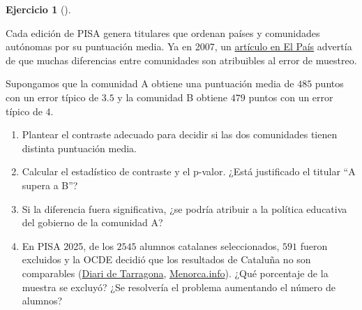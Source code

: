 \documentclass[
  spanish,
  a4paper,
]{scrreport}
\theoremstyle{definition}
\newtheorem{exercise}{Ejercicio}[chapter]
\theoremstyle{remark}
\begin{document}
\begin{exercise}[]\protect\hypertarget{exr-interpretacion-pisa}{}\label{exr-interpretacion-pisa}

Cada edición de PISA genera titulares que ordenan países y comunidades
autónomas por su puntuación media. Ya en 2007, un
\href{https://www.uv.es/valerop/Docencia/Anadatos/Introduccion/interpretacionPISA.pdf}{artículo
en El País} advertía de que muchas diferencias entre comunidades son
atribuibles al error de muestreo.

Supongamos que la comunidad A obtiene una puntuación media de \(485\)
puntos con un error típico de \(3.5\) y la comunidad B obtiene \(479\)
puntos con un error típico de \(4\).

\begin{enumerate}
\def\labelenumi{\alph{enumi}.}
\item
  Plantear el contraste adecuado para decidir si las dos comunidades
  tienen distinta puntuación media.
\item
  Calcular el estadístico de contraste y el p-valor. ¿Está justificado
  el titular ``A supera a B''?
\item
  Si la diferencia fuera significativa, ¿se podría atribuir a la
  política educativa del gobierno de la comunidad A?
\item
  En PISA 2025, de los \(2545\) alumnos catalanes seleccionados, \(591\)
  fueron excluidos y la OCDE decidió que los resultados de Cataluña no
  son comparables
  (\href{https://www.diaridetarragona.com/catalunya/266692/catalunya-queda-fuera-pruebas-pisa-incidencia-tecnica.html}{Diari
  de Tarragona},
  \href{https://www.menorca.info/actualidad/nacional/2026/07/29/2679357/ministerio-alerto-generalitat-errores-tecnicos-pruebas-pisa-2025.html}{Menorca.info}).
  ¿Qué porcentaje de la muestra se excluyó? ¿Se resolvería el problema
  aumentando el número de alumnos?
\end{enumerate}

\end{exercise}
\end{document}
